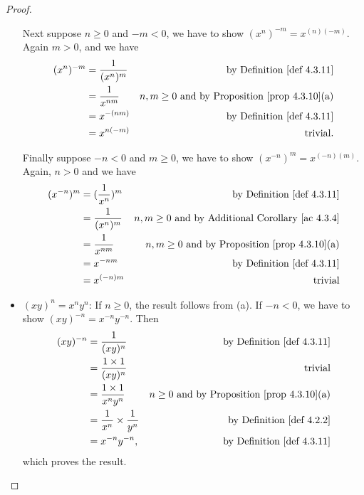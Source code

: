 \begin{proof}
\begin{itemize}
        Next suppose \(n \ge 0\) and \(-m < 0\), we have to show \((x^{n})^{-m} = x^{(n)(-m)}\).
        Again \(m > 0\), and we have
        \begin{align*}
            (x^n)^{-m} & = \frac1{(x^n)^m} & \text{by \DEF{4.3.11}} \\
                       & = \frac1{x^{nm}} & \text{\(n, m \ge 0\) and by \PROP{4.3.10}(a)} \\
                       & = x^{-(nm)} & \text{by \DEF{4.3.11}} \\ 
                       & = x^{n(-m)} & \text{trivial}.    
        \end{align*}

        Finally suppose \(-n < 0\) and \(m \geq 0\), we have to show \((x^{-n})^{m} = x^{(-n)(m)}\).
        Again, \(n > 0\) and we have
        \begin{align*}
            (x^{-n})^m & = (\frac1{x^n})^m & \text{by \DEF{4.3.11}} \\
                       & = \frac1{(x^{n})^m} & \text{\(n, m \ge 0\) and by \AC{4.3.4}} \\
                       & = \frac1{x^{nm}} & \text{\(n, m \ge 0\) and by \PROP{4.3.10}(a)} \\
                       & = x^{-nm} & \text{by \DEF{4.3.11}} \\
                       & = x^{(-n)m} & \text{trivial}
        \end{align*}
    \item \((xy)^n = x^ny^n\):
        If \(n \geq 0\), the result follows from (a).
        If \(-n < 0\), we have to show \((xy)^{-n} = x^{-n}y^{-n}\).
        Then 
        \begin{align*}
            (xy)^{-n} & = \frac1{(xy)^n} & \text{by \DEF{4.3.11}} \\
                      & = \frac{1 \X 1}{(xy)^n} & \text{trivial} \\
                      & = \frac{1 \X 1}{x^n y^n} & \text{\(n \ge 0\) and by \PROP{4.3.10}(a)} \\
                      & = \frac1{x^n} \X \frac1{y^n} & \text{by \DEF{4.2.2}} \\
                      & = x^{-n} y^{-n}, & \text{by \DEF{4.3.11}}
        \end{align*}
        which proves the result.
\end{itemize}


\end{proof}
